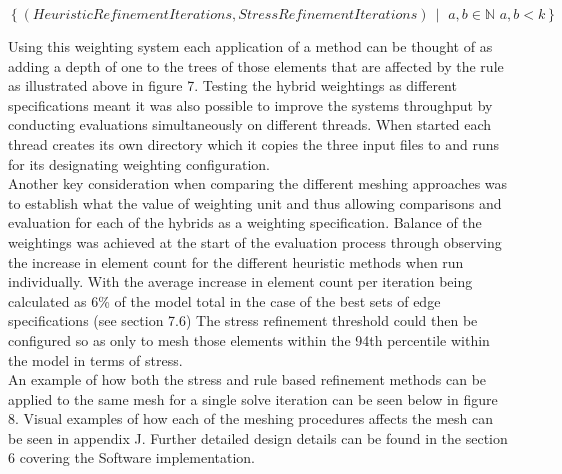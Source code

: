 \[ \left\{ (HeuristicRefinementIterations, StressRefinementIterations) \,\middle|\, \, a,b \in \mathbb{N}\, \, a,b < k \right\} \]

\noindent
Using this weighting system each application of a method can be thought of as adding a depth of one to the trees of those elements that are affected by the rule as illustrated above in figure 7. Testing the hybrid weightings as different specifications meant it was also possible to improve the systems throughput by conducting evaluations simultaneously on different threads. When started each thread creates its own directory which it copies the three input files to and runs for its designating weighting configuration. \\

\noindent
Another key consideration when comparing the different meshing approaches was to establish what the value of weighting unit and thus allowing comparisons and evaluation for each of the hybrids as a weighting specification. Balance of the weightings was achieved at the start of the evaluation process through observing the increase in element count for the different heuristic methods when run individually. With the average increase in element count per iteration being calculated as 6\% of the model total in the case of the best sets of edge specifications (see section 7.6) The stress refinement threshold could then be configured so as only to mesh those elements within the 94th percentile within the model in terms of stress. \\

\noindent
An example of how both the stress and rule based refinement methods can be applied to the same mesh for a single solve iteration can be seen below in figure 8. Visual examples of how each of the meshing procedures affects the mesh can be seen in appendix J. Further detailed design details can be found in the section 6 covering the Software implementation. \\

